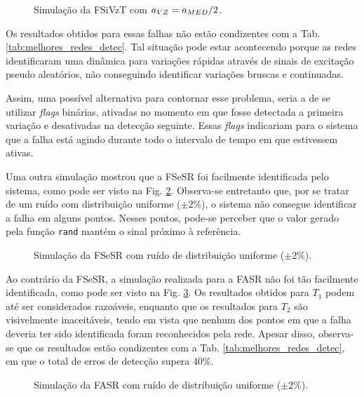 \begin{figure}[htb]
\footnotesize
\centering

\vspace{1cm}
\caption{Simulação da FSiVzT com $a_{\tiny VZ} = a_{\tiny MED}/2$.}
\label{fig:fsivzt}
\end{figure}

Os resultados obtidos para essas falhas não estão condizentes com a Tab.
\ref{tab:melhores_redes_detec}. Tal situação pode estar acontecendo porque as
redes identificaram uma dinâmica para variações rápidas através de sinais de
excitação pseudo aleatórios, não conseguindo identificar variações bruscas e
continuadas.

Assim, uma possível alternativa para contornar esse problema, seria a de se
utilizar {\it flags} binárias, ativadas no momento em que fosse detectada a
primeira variação e desativadas na detecção seguinte. Essas {\it flags}
indicariam para o sistema que a falha está agindo durante todo o intervalo de
tempo em que estivessem ativas.

Uma outra simulação mostrou que a FSeSR foi facilmente identificada pelo
sistema, como pode ser visto na Fig. \ref{fig:fsesr}. Observa-se entretanto que,
por se tratar de um ruído com distribuição uniforme ($\pm 2\%$), o sistema não
consegue identificar a falha em alguns pontos. Nesses pontos, pode-se perceber
que o valor gerado pela função {\tt rand} mantém o sinal próximo à referência.

\begin{figure}[htb]
\footnotesize
\centering

\vspace{1cm}
\caption{Simulação da FSeSR com ruído de distribuição uniforme ($\pm 2\%$).}
\label{fig:fsesr}
\end{figure}

Ao contrário da FSeSR, a simulação realizada para a FASR não foi tão facilmente
identificada, como pode ser visto na Fig. \ref{fig:fasr}. Os resultados obtidos
para $T_1$ podem até ser considerados razoáveis, enquanto que os resultados para
$T_2$ são visivelmente inaceitáveis, tendo em vista que nenhum dos pontos em que
a falha deveria ter sido identificada foram reconhecidos pela rede. Apesar
disso, observa-se que os resultados estão condizentes com a Tab.
\ref{tab:melhores_redes_detec}, em que o total de erros de detecção supera 40\%.

\begin{figure}[htb] 
\footnotesize 
\centering 

\vspace{1cm} 
\caption{Simulação da FASR com ruído de distribuição uniforme ($\pm 2\%$).} 
\label{fig:fasr} 
\end{figure}

